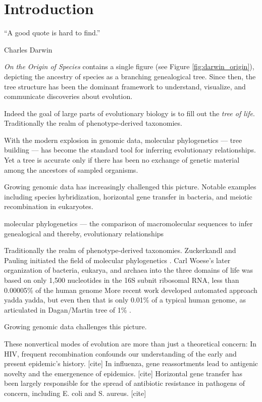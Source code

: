 \chapter{Introduction}
\label{ch:introduction}

\epigraph{``A good quote is hard to find.''}{Charles Darwin}

\emph{On the Origin of Species} contains a single figure (see Figure \ref{fig:darwin_origin}), depicting the ancestry of species as a branching genealogical tree.
Since then, the tree structure has been the dominant framework to understand, visualize, and communicate discoveries about evolution.

Indeed the goal of large parts of evolutionary biology is to fill out the \emph{tree of life}.
Traditionally the realm of phenotype-derived taxonomies.

With the modern explosion in genomic data, molecular phylogenetics –-- tree building –-- has become the standard tool for inferring evolutionary relationships. 
Yet a tree is accurate only if there has been no exchange of genetic material among the ancestors of sampled organisms.

Growing genomic data has increasingly challenged this picture.
Notable examples including species hybridization, horizontal gene transfer in bacteria, and meiotic recombination in eukaryotes.

molecular phylogenetics — the comparison of macromolecular sequences to infer genealogical and thereby, evolutionary relationships

Traditionally the realm of phenotype-derived taxonomies.
Zuckerkandl and Pauling initiated the field of molecular phylogenetics \cite{Zuckerkandl:1965wi}.
Carl Woese's later organization of bacteria, eukarya, and archaea into the three domains of life was based on only 1,500 nucleotides in the 16S subnit ribosomal RNA, less than 0.00005\% of the human genome \cite{Woese:1977vd}
More recent work developed automated approach yadda yadda\cite{Ciccarelli:2006gw}, but even then that is only 0.01\% of a typical human genome, as articulated in Dagan/Martin tree of 1\% \cite{Dagan:2006}.

Growing genomic data challenges this picture.

These nonvertical modes of evolution are more than just a theoretical concern:
In HIV, frequent recombination confounds our understanding of the early and present epidemic’s history. [cite]
In influenza, gene reassortments lead to antigenic novelty and the emergenence of epidemics. [cite]
Horizontal gene transfer has been largely responsible for the spread of antibiotic resistance in pathogens of concern, including E. coli and S. aureus. [cite]

